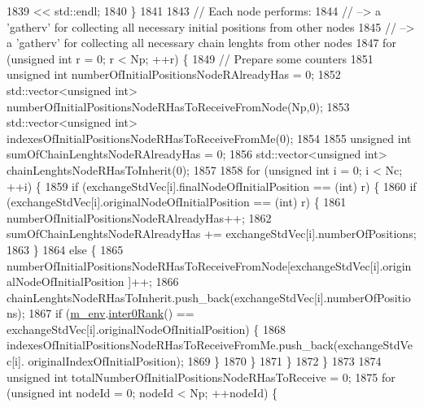 \begin{DoxyCode}
1839                             << std::endl;
1840   \}
1841 
1843   \textcolor{comment}{// Each node performs:}
1844   \textcolor{comment}{// --> a 'gatherv' for collecting all necessary initial positions from other nodes}
1845   \textcolor{comment}{// --> a 'gatherv' for collecting all necessary chain lenghts from other nodes}
1847 \textcolor{comment}{}  \textcolor{keywordflow}{for} (\textcolor{keywordtype}{unsigned} \textcolor{keywordtype}{int} r = 0; r < Np; ++r) \{
1849     \textcolor{comment}{// Prepare some counters}
1851 \textcolor{comment}{}    \textcolor{keywordtype}{unsigned} \textcolor{keywordtype}{int}              numberOfInitialPositionsNodeRAlreadyHas = 0;
1852     std::vector<unsigned int> numberOfInitialPositionsNodeRHasToReceiveFromNode(Np,0);
1853     std::vector<unsigned int> indexesOfInitialPositionsNodeRHasToReceiveFromMe(0);
1854 
1855     \textcolor{keywordtype}{unsigned} \textcolor{keywordtype}{int}              sumOfChainLenghtsNodeRAlreadyHas = 0;
1856     std::vector<unsigned int> chainLenghtsNodeRHasToInherit(0);
1857 
1858     \textcolor{keywordflow}{for} (\textcolor{keywordtype}{unsigned} \textcolor{keywordtype}{int} i = 0; i < Nc; ++i) \{
1859       \textcolor{keywordflow}{if} (exchangeStdVec[i].finalNodeOfInitialPosition == (\textcolor{keywordtype}{int}) r) \{
1860         \textcolor{keywordflow}{if} (exchangeStdVec[i].originalNodeOfInitialPosition == (\textcolor{keywordtype}{int}) r) \{
1861           numberOfInitialPositionsNodeRAlreadyHas++;
1862           sumOfChainLenghtsNodeRAlreadyHas += exchangeStdVec[i].numberOfPositions;
1863         \}
1864         \textcolor{keywordflow}{else} \{
1865           numberOfInitialPositionsNodeRHasToReceiveFromNode[exchangeStdVec[i].originalNodeOfInitialPosition
      ]++;
1866           chainLenghtsNodeRHasToInherit.push\_back(exchangeStdVec[i].numberOfPositions);
1867           \textcolor{keywordflow}{if} (\hyperlink{class_q_u_e_s_o_1_1_m_l_sampling_a13f1ca4fe9f94822fe572a743eaced1d}{m\_env}.\hyperlink{class_q_u_e_s_o_1_1_base_environment_ae106b5bb8a80b655b88b3a26b1e7c185}{inter0Rank}() == exchangeStdVec[i].originalNodeOfInitialPosition) \{
1868             indexesOfInitialPositionsNodeRHasToReceiveFromMe.push\_back(exchangeStdVec[i].
      originalIndexOfInitialPosition);
1869           \}
1870         \}
1871       \}
1872     \}
1873 
1874     \textcolor{keywordtype}{unsigned} \textcolor{keywordtype}{int} totalNumberOfInitialPositionsNodeRHasToReceive = 0;
1875     \textcolor{keywordflow}{for} (\textcolor{keywordtype}{unsigned} \textcolor{keywordtype}{int} nodeId = 0; nodeId < Np; ++nodeId) \{

\end{DoxyCode}
